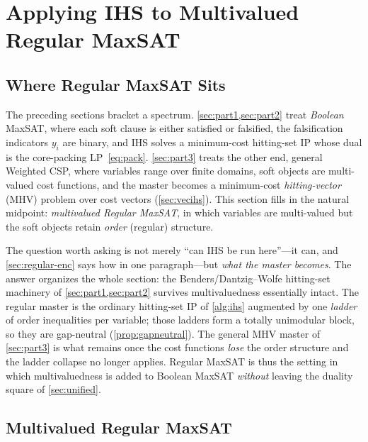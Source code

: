\section{Applying IHS to Multivalued Regular MaxSAT}
\label{sec:regular}

\subsection{Where Regular MaxSAT Sits}
\label{sec:regular-place}

The preceding sections bracket a spectrum. \cref{sec:part1,sec:part2} treat
\emph{Boolean} MaxSAT, where each soft clause is either satisfied or
falsified, the falsification indicators $y_i$ are binary, and IHS solves a
minimum-cost hitting-set IP whose dual is the core-packing LP~\eqref{eq:pack}.
\cref{sec:part3} treats the other end, general Weighted CSP, where variables
range over finite domains, soft objects are multi-valued cost functions, and
the master becomes a minimum-cost \emph{hitting-vector} (MHV) problem over cost
vectors (\cref{sec:vecihs}). This section fills in the natural midpoint:
\emph{multivalued Regular MaxSAT}, in which variables are multi-valued but the
soft objects retain \emph{order} (regular) structure.

The question worth asking is not merely ``can IHS be run here''---it can, and
\cref{sec:regular-enc} says how in one paragraph---but \emph{what the master
becomes}. The answer organizes the whole section: the Benders/Dantzig--Wolfe
hitting-set machinery of \cref{sec:part1,sec:part2} survives multivaluedness
essentially intact. The regular master is the ordinary hitting-set IP of
\cref{alg:ihs} augmented by one \emph{ladder} of order inequalities per
variable; those ladders form a totally unimodular block, so they are
gap-neutral (\cref{prop:gapneutral}). The general MHV master of \cref{sec:part3}
is what remains once the cost functions \emph{lose} the order structure and the
ladder collapse no longer applies. Regular MaxSAT is thus the setting in which
multivaluedness is added to Boolean MaxSAT \emph{without} leaving the
duality square of \cref{sec:unified}.

\subsection{Multivalued Regular MaxSAT}
\label{sec:regular-def}

